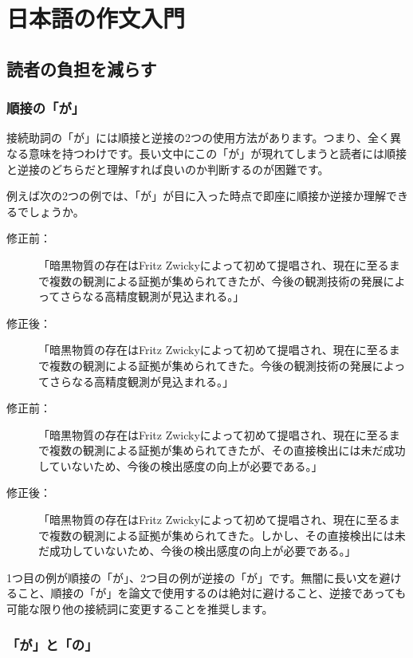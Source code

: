 \chapter{日本語の作文入門}

\section{読者の負担を減らす}

\subsection{順接の「が」}

接続助詞の「が」には順接と逆接の2つの使用方法があります。つまり、全く異なる意味を持つわけです。長い文中にこの「が」が現れてしまうと読者には順接と逆接のどちらだと理解すれば良いのか判断するのが困難です。

例えば次の2つの例では、「が」が目に入った時点で即座に順接か逆接か理解できるでしょうか。

\begin{description}
\item[修正前：]「暗黒物質の存在はFritz Zwickyによって初めて提唱され、現在に至るまで複数の観測による証拠が集められてきたが、今後の観測技術の発展によってさらなる高精度観測が見込まれる。」
\item[修正後：]「暗黒物質の存在はFritz Zwickyによって初めて提唱され、現在に至るまで複数の観測による証拠が集められてきた。今後の観測技術の発展によってさらなる高精度観測が見込まれる。」
\end{description}

\begin{description}
\item[修正前：]「暗黒物質の存在はFritz Zwickyによって初めて提唱され、現在に至るまで複数の観測による証拠が集められてきたが、その直接検出には未だ成功していないため、今後の検出感度の向上が必要である。」
\item[修正後：]「暗黒物質の存在はFritz Zwickyによって初めて提唱され、現在に至るまで複数の観測による証拠が集められてきた。しかし、その直接検出には未だ成功していないため、今後の検出感度の向上が必要である。」
\end{description}

1つ目の例が順接の「が」、2つ目の例が逆接の「が」です。無闇に長い文を避けること、順接の「が」を論文で使用するのは絶対に避けること、逆接であっても可能な限り他の接続詞に変更することを推奨します。

\subsection{「が」と「の」}

